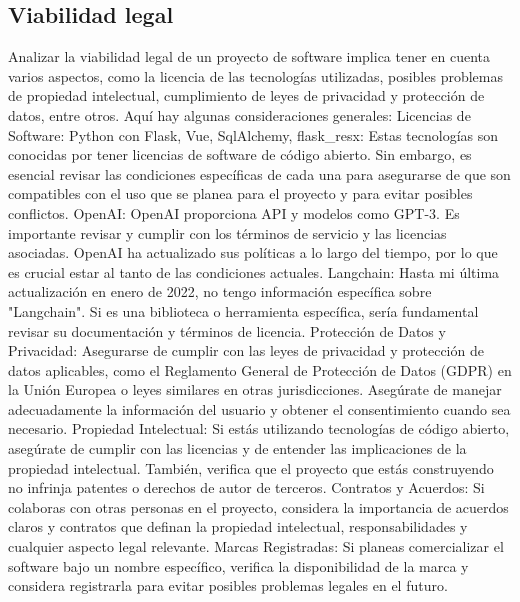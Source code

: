 \subsection{Viabilidad legal}

Analizar la viabilidad legal de un proyecto de software implica tener en cuenta varios aspectos, como la licencia de las tecnologías utilizadas, posibles problemas de propiedad intelectual, cumplimiento de leyes de privacidad y protección de datos, entre otros. Aquí hay algunas consideraciones generales:
Licencias de Software:
Python con Flask, Vue, SqlAlchemy, flask_resx: Estas tecnologías son conocidas por tener licencias de software de código abierto. Sin embargo, es esencial revisar las condiciones específicas de cada una para asegurarse de que son compatibles con el uso que se planea para el proyecto y para evitar posibles conflictos.
OpenAI: OpenAI proporciona API y modelos como GPT-3. Es importante revisar y cumplir con los términos de servicio y las licencias asociadas. OpenAI ha actualizado sus políticas a lo largo del tiempo, por lo que es crucial estar al tanto de las condiciones actuales.
Langchain: Hasta mi última actualización en enero de 2022, no tengo información específica sobre "Langchain". Si es una biblioteca o herramienta específica, sería fundamental revisar su documentación y términos de licencia.
Protección de Datos y Privacidad:
Asegurarse de cumplir con las leyes de privacidad y protección de datos aplicables, como el Reglamento General de Protección de Datos (GDPR) en la Unión Europea o leyes similares en otras jurisdicciones. Asegúrate de manejar adecuadamente la información del usuario y obtener el consentimiento cuando sea necesario.
Propiedad Intelectual:
Si estás utilizando tecnologías de código abierto, asegúrate de cumplir con las licencias y de entender las implicaciones de la propiedad intelectual. También, verifica que el proyecto que estás construyendo no infrinja patentes o derechos de autor de terceros.
Contratos y Acuerdos:
Si colaboras con otras personas en el proyecto, considera la importancia de acuerdos claros y contratos que definan la propiedad intelectual, responsabilidades y cualquier aspecto legal relevante.
Marcas Registradas:
Si planeas comercializar el software bajo un nombre específico, verifica la disponibilidad de la marca y considera registrarla para evitar posibles problemas legales en el futuro.
